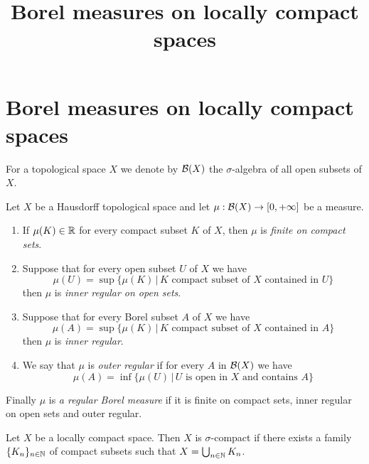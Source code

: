 



\title{Borel measures on locally compact spaces}
\date{}
\maketitle

\section{Borel measures on locally compact spaces}
\noindent
For a topological space $X$ we denote by ${\mathcal B}(X)$ the $\sigma$-algebra of all open subsets of $X$.

\begin{definition}
Let $X$ be a Hausdorff topological space and let $\mu:{\mathcal B}(X)\rightarrow [0,+\infty]$ be a measure.
\begin{enumerate}[label=\textbf{(\arabic*)}, leftmargin=3.0em]
\item If $\mu(K)\in {\mathbb R}$ for every compact subset $K$ of $X$, then $\mu$ is \textit{finite on compact sets}.
\item Suppose that for every open subset $U$ of $X$ we have
$$\mu(U) = \sup \big\{\mu(K)\,\big|\,K\mbox{ compact subset of }X\mbox{ contained in }U\big\}$$
then $\mu$ is \textit{inner regular on open sets}.
\item Suppose that for every Borel subset $A$ of $X$ we have
$$\mu(A) = \sup \big\{\mu(K)\,\big|\,K\mbox{ compact subset of }X\mbox{ contained in }A\big\}$$
then $\mu$ is \textit{inner regular}.
\item  We say that $\mu$ is \textit{outer regular} if for every $A$ in ${\mathcal B}(X)$ we have
$$\mu(A) = \inf \big\{\mu(U)\,\big|\,U\mbox{ is open in }X\mbox{ and contains }A\big\}$$
\end{enumerate}
Finally $\mu$ is \textit{a regular Borel measure} if it is finite on compact sets, inner regular on open sets and outer regular. 
\end{definition}

\begin{definition}
Let $X$ be a locally compact space. Then $X$ is $\sigma$-compact if there exists a family $\{K_n\}_{n\in {\mathbb N}}$ of compact subsets such that $X =\bigcup_{n\in {\mathbb N}}K_n$.
\end{definition}

